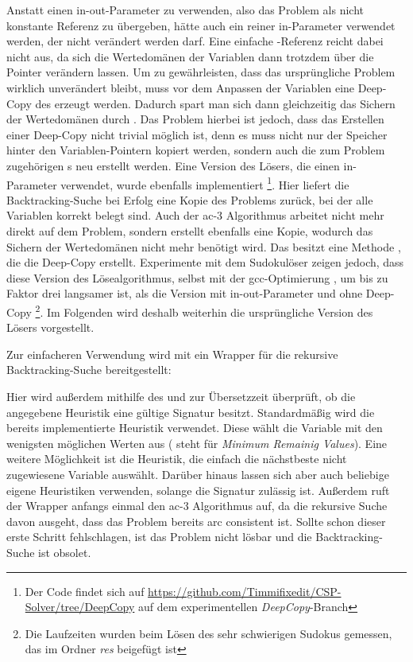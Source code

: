 Anstatt einen in-out-Parameter zu verwenden, also das Problem als nicht konstante Referenz zu übergeben, hätte auch ein reiner in-Parameter verwendet werden, der nicht verändert
werden darf. Eine einfache -Referenz reicht dabei nicht aus, da sich die Wertedomänen der Variablen dann trotzdem über die Pointer verändern lassen. Um zu
gewährleisten, dass das ursprüngliche Problem wirklich unverändert bleibt, muss vor dem Anpassen der Variablen eine Deep-Copy des  erzeugt werden. Dadurch spart
man sich dann gleichzeitig das Sichern der Wertedomänen durch . Das Problem hierbei ist jedoch, dass das Erstellen einer Deep-Copy nicht trivial
möglich ist, denn es muss nicht nur der Speicher hinter den Variablen-Pointern kopiert werden, sondern auch die zum Problem zugehörigen s neu erstellt werden. Eine 
Version des Lösers, die einen in-Parameter verwendet, wurde ebenfalls implementiert \footnote{Der Code findet sich auf \url{https://github.com/Timmifixedit/CSP-Solver/tree/DeepCopy}
auf dem experimentellen \textit{DeepCopy}-Branch}. Hier liefert die Backtracking-Suche bei Erfolg eine Kopie des Problems zurück, bei der alle Variablen korrekt belegt sind. Auch
der \ac*{ac}-3 Algorithmus arbeitet nicht mehr direkt auf dem Problem, sondern erstellt ebenfalls eine Kopie, wodurch das Sichern der Wertedomänen nicht mehr benötigt wird. Das
 besitzt eine Methode , die die Deep-Copy erstellt. Experimente mit dem Sudokulöser zeigen jedoch, dass diese Version des Lösealgorithmus,
selbst mit der gcc-Optimierung , um bis zu Faktor drei langsamer ist, als die Version mit in-out-Parameter und ohne Deep-Copy \footnote{Die Laufzeiten wurden beim
Lösen des sehr schwierigen Sudokus gemessen, das im Ordner \textit{res} beigefügt ist}. Im Folgenden wird deshalb weiterhin die ursprüngliche Version des Lösers vorgestellt.

Zur einfacheren Verwendung wird mit  ein Wrapper für die rekursive Backtracking-Suche bereitgestellt:

Hier wird außerdem mithilfe des  und  zur Übersetzzeit überprüft, ob die angegebene Heuristik eine gültige Signatur besitzt.
Standardmäßig wird die bereits implementierte Heuristik  verwendet. Diese wählt die Variable mit den wenigsten möglichen Werten aus ( steht
für \textit{Minimum Remainig Values}). Eine weitere Möglichkeit ist die  Heuristik, die einfach die nächstbeste nicht zugewiesene Variable auswählt.
Darüber hinaus lassen sich aber auch beliebige eigene Heuristiken verwenden, solange die Signatur zulässig ist. Außerdem ruft der Wrapper anfangs einmal den \ac*{ac}-3 Algorithmus
auf, da die rekursive Suche davon ausgeht, dass das Problem bereits arc consistent ist. Sollte schon dieser erste Schritt fehlschlagen, ist das Problem nicht lösbar und die
Backtracking-Suche ist obsolet.